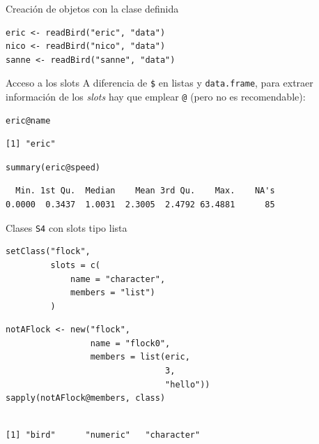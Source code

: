 \documentclass[xcolor={usenames,svgnames,dvipsnames}]{beamer}
\begin{document}
\begin{frame}[label={sec:org4f1b7a1},fragile]{Creación de objetos con la clase definida}
 \lstset{language=r,label= ,caption= ,captionpos=b,numbers=none}
\begin{lstlisting}
eric <- readBird("eric", "data")
nico <- readBird("nico", "data")
sanne <- readBird("sanne", "data")
\end{lstlisting}
\end{frame}


\begin{frame}[label={sec:orgac76d3f},fragile]{Acceso a los slots}
 A diferencia de \texttt{\$} en listas y \texttt{data.frame}, para extraer información de los \emph{slots} hay que emplear \texttt{@} (pero no es recomendable):
\lstset{language=r,label= ,caption= ,captionpos=b,numbers=none}
\begin{lstlisting}
eric@name
\end{lstlisting}

\begin{verbatim}
[1] "eric"
\end{verbatim}


\lstset{language=r,label= ,caption= ,captionpos=b,numbers=none}
\begin{lstlisting}
summary(eric@speed)
\end{lstlisting}

\begin{verbatim}
  Min. 1st Qu.  Median    Mean 3rd Qu.    Max.    NA's 
0.0000  0.3437  1.0031  2.3005  2.4792 63.4881      85
\end{verbatim}
\end{frame}

\begin{frame}[label={sec:orgdad5099},fragile]{Clases \texttt{S4} con slots tipo lista}
 \lstset{language=r,label= ,caption= ,captionpos=b,numbers=none}
\begin{lstlisting}
setClass("flock",
         slots = c(
             name = "character",
             members = "list")
         )

\end{lstlisting}

\lstset{language=r,label= ,caption= ,captionpos=b,numbers=none}
\begin{lstlisting}
notAFlock <- new("flock",
                 name = "flock0",
                 members = list(eric,
                                3,
                                "hello"))
sapply(notAFlock@members, class)
\end{lstlisting}

\begin{verbatim}

[1] "bird"      "numeric"   "character"
\end{verbatim}
\end{frame}
\end{document}
